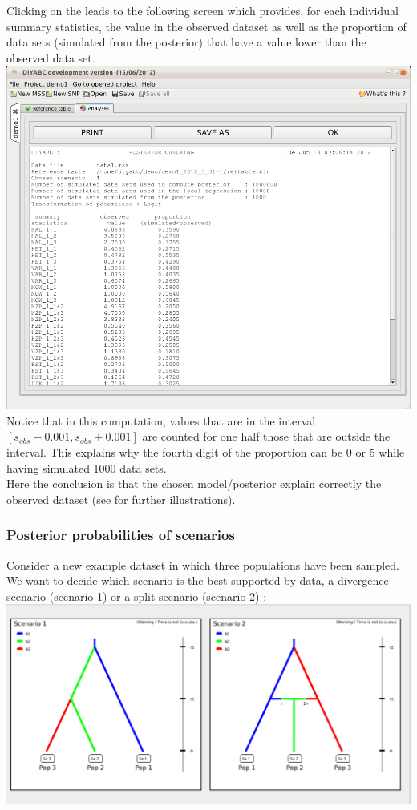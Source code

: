 Clicking on the  leads to the following screen which provides, for each individual summary statistics, the value in the observed dataset as well as the proportion of data sets (simulated from the posterior) that have a value lower than the observed data set.\\
 
\includegraphics[scale=0.33]{gui_pictures/Capture-DIYABC-60.png} \\


Notice that in this computation, values that are in the interval $[s_{obs}-0.001,s_{obs}+0.001]$ are counted for one half those that are outside the interval. This explains why the fourth digit of the proportion can be 0 or 5 while having simulated 1000 data sets.\\
Here the conclusion is that the chosen model/posterior explain correctly the observed dataset (see \cite{C2010} for further illustrations). 

\subsubsection{Posterior probabilities of scenarios}
Consider a new example dataset in which three populations have been sampled. We want to decide which scenario is the best supported by data, a divergence scenario (scenario 1) or a split scenario (scenario 2) :\\

\includegraphics[scale=0.33]{gui_pictures/Capture-DIYABC-113.png} \\

